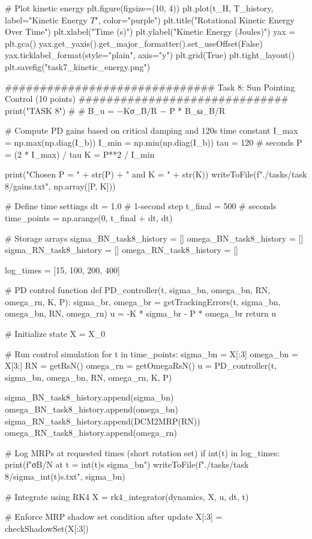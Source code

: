 \documentclass[conf]{new-aiaa}
\begin{document}
\begin{pythoncode}
# Plot kinetic energy
plt.figure(figsize=(10, 4))
plt.plot(t_H, T_history, label="Kinetic Energy $T$", color="purple")
plt.title("Rotational Kinetic Energy Over Time")
plt.xlabel("Time (s)")
plt.ylabel("Kinetic Energy (Joules)")
yax = plt.gca()
yax.get_yaxis().get_major_formatter().set_useOffset(False)
yax.ticklabel_format(style="plain", axis="y")
plt.grid(True)
plt.tight_layout()
plt.savefig("task7_kinetic_energy.png")


############################## Task 8: Sun Pointing Control (10 points) ##############################
print("\n\nBEGIN TASK 8")
# # B_u = −Kσ_B/R − P * B_ω_B/R

# Compute PD gains based on critical damping and 120s time constant
I_max = np.max(np.diag(I_b))
I_min = np.min(np.diag(I_b))
tau = 120  # seconds
P = (2 * I_max) / tau
K = P**2 / I_min

print("Chosen P = " + str(P) + " and K = " + str(K))
writeToFile(f"./tasks/task 8/gains.txt", np.array([P, K]))

# Define time settings
dt = 1.0  # 1-second step
t_final = 500  # seconds
time_points = np.arange(0, t_final + dt, dt)

# Storage arrays
sigma_BN_task8_history = []
omega_BN_task8_history = []
sigma_RN_task8_history = []
omega_RN_task8_history = []

log_times = [15, 100, 200, 400]


# PD control function
def PD_controller(t, sigma_bn, omega_bn, RN, omega_rn, K, P):
    sigma_br, omega_br = getTrackingErrors(t, sigma_bn, omega_bn, RN, omega_rn)
    u = -K * sigma_br - P * omega_br
    return u


# Initialize state
X = X_0

# Run control simulation
for t in time_points:
    sigma_bn = X[:3]
    omega_bn = X[3:]
    RN = getRsN()
    omega_rn = getOmegaRsN()
    u = PD_controller(t, sigma_bn, omega_bn, RN, omega_rn, K, P)

    sigma_BN_task8_history.append(sigma_bn)
    omega_BN_task8_history.append(omega_bn)
    sigma_RN_task8_history.append(DCM2MRP(RN))
    omega_RN_task8_history.append(omega_rn)

    # Log MRPs at requested times (short rotation set)
    if int(t) in log_times:
        print(f"σB/N at t = {int(t)}s {sigma_bn}")
        writeToFile(f"./tasks/task 8/sigma_{int(t)}s.txt", sigma_bn)

    # Integrate using RK4
    X = rk4_integrator(dynamics, X, u, dt, t)

    # Enforce MRP shadow set condition after update
    X[:3] = checkShadowSet(X[:3])


\end{pythoncode}
\end{document}
